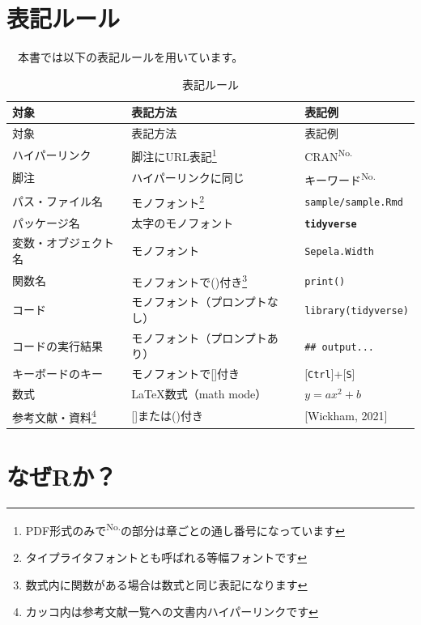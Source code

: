 \documentclass[
  12pt,
]{book}
\begin{document}
\newpage

\hypertarget{ux8868ux8a18ux30ebux30fcux30eb}{%
\section*{表記ルール}\label{ux8868ux8a18ux30ebux30fcux30eb}}

　本書では以下の表記ルールを用いています。

\begin{longtable}[]{@{}lll@{}}
\caption{表記ルール}\tabularnewline
\toprule
対象 & 表記方法 & 表記例 \\
\midrule
\endfirsthead
\toprule
対象 & 表記方法 & 表記例 \\
\midrule
\endhead
ハイパーリンク & 脚注にURL表記\footnote{PDF形式のみで\textsuperscript{No.}の部分は章ごとの通し番号になっています} & CRAN\textsuperscript{No.} \\
脚注 & ハイパーリンクに同じ & キーワード\textsuperscript{No.} \\
パス・ファイル名 & モノフォント\footnote{タイプライタフォントとも呼ばれる等幅フォントです} & \texttt{sample/sample.Rmd} \\
パッケージ名 & 太字のモノフォント & \textbf{\texttt{tidyverse}} \\
変数・オブジェクト名 & モノフォント & \texttt{Sepela.Width} \\
関数名 & モノフォントで()付き\footnote{数式内に関数がある場合は数式と同じ表記になります} & \texttt{print()} \\
コード & モノフォント（プロンプトなし） & \texttt{library(tidyverse)} \\
コードの実行結果 & モノフォント（プロンプトあり） & \texttt{\#\#\ output...} \\
キーボードのキー & モノフォントで{[}{]}付き & {[}\texttt{Ctrl}{]}+{[}\texttt{S}{]} \\
数式 & \LaTeX 数式（math mode） & \(y = ax^2 + b\) \\
参考文献・資料\footnote{カッコ内は参考文献一覧への文書内ハイパーリンクです} & {[}{]}または()付き & {[}Wickham, 2021{]} \\
\bottomrule
\end{longtable}

\hypertarget{ux306aux305crux304b}{%
\section*{\texorpdfstring{なぜ\textbf{R}か？}{なぜRか？}}\label{ux306aux305crux304b}}
\end{document}
